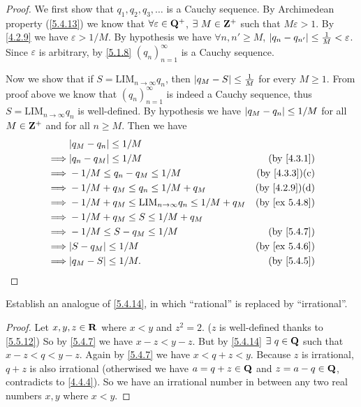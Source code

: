 \begin{proof}
  We first show that \(q_1, q_2, q_3, \dots\) is a Cauchy sequence.
  By Archimedean property (\cref{5.4.13}) we know that \(\forall \varepsilon \in \mathbf{Q}^+\), \(\exists\ M \in \mathbf{Z}^+\) such that \(M\varepsilon > 1\).
  By \cref{4.2.9} we have \(\varepsilon > 1 / M\).
  By hypothesis we have \(\forall n, n' \geq M\), \(\left\lvert q_n - q_{n'}\right\rvert \leq \frac{1}{M} < \varepsilon\).
  Since \(\varepsilon\) is arbitrary, by \cref{5.1.8} \((q_n)_{n = 1}^{\infty}\) is a Cauchy sequence.

  Now we show that if \(S = \text{LIM}_{n \to \infty} q_n\), then \(\left\lvert q_M - S\right\rvert \leq \frac{1}{M}\) for every \(M \geq 1\).
  From proof above we know that \((q_n)_{n = 1}^\infty\) is indeed a Cauchy sequence, thus \(S = \text{LIM}_{n \to \infty} q_n\) is well-defined.
  By hypothesis we have \(\left\lvert q_M - q_n\right\rvert \leq 1 / M\) for all \(M \in \mathbf{Z}^+\) and for all \(n \geq M\).
  Then we have
  \begin{align*}
             & \abs{q_M - q_n} \leq 1 / M                                                                     \\
    \implies & \abs{q_n - q_M} \leq 1 / M                                       & \text{(by \cref{4.3.1})}    \\
    \implies & -1 / M \leq q_n - q_M \leq 1 / M                                 & \text{(by \cref{4.3.3})(c)} \\
    \implies & -1 / M + q_M \leq q_n \leq 1 / M + q_M                           & \text{(by \cref{4.2.9})(d)} \\
    \implies & -1 / M + q_M \leq \text{LIM}_{n \to \infty} q_n \leq 1 / M + q_M & \text{(by \cref{ex 5.4.8})} \\
    \implies & -1 / M + q_M \leq S \leq 1 / M + q_M                                                           \\
    \implies & -1 / M \leq S - q_M \leq 1 / M                                   & \text{(by \cref{5.4.7})}    \\
    \implies & \abs{S - q_M} \leq 1 / M                                         & \text{(by \cref{ex 5.4.6})} \\
    \implies & \abs{q_M - S} \leq 1 / M.                                        & \text{(by \cref{5.4.5})}
  \end{align*}
\end{proof}

\begin{exercise}\label{ex 5.5.5}
  Establish an analogue of \cref{5.4.14}, in which ``rational'' is replaced by ``irrational''.
\end{exercise}

\begin{proof}
  Let \(x, y, z \in \mathbf{R}\) where \(x < y\) and \(z^2 = 2\).
  (\(z\) is well-defined thanks to \cref{5.5.12})
  So by \cref{5.4.7} we have \(x - z < y - z\).
  But by \cref{5.4.14} \(\exists\ q \in \Q\) such that \(x - z < q < y - z\).
  Again by \cref{5.4.7} we have \(x < q + z < y\).
  Because \(z\) is irrational, \(q + z\) is also irrational
  (otherwised we have \(a = q + z \in \mathbf{Q}\) and \(z = a - q \in \mathbf{Q}\), contradicts to \cref{4.4.4}).
  So we have an irrational number in between any two real numbers \(x, y\) where \(x < y\).
\end{proof}